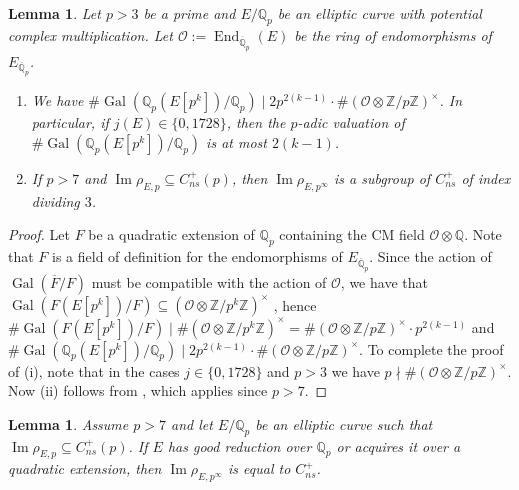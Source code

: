 \documentclass{amsart}
\newcommand{\op}[1]{\operatorname{#1}}
\newcommand{\Qp}{\mathbb{Q}_p}
\newcommand{\Qpbar}{\overline{\mathbb{Q}}_p}
\newtheorem{lemma}[theorem]{Lemma}
\theoremstyle{definition}
\newcommand{\Z}{\mathbb{Z}}
\newcommand{\Q}{\mathbb{Q}}
\numberwithin{theorem}{section}
\numberwithin{equation}{section}
\begin{document}
\begin{lemma}\label{lemma: description in potential CM case}
    Let $p>3$ be a prime and $E/\Q_p$ be an elliptic curve with potential complex multiplication. Let $\mathcal{O}:=\op{End}_{\Qpbar}(E)$ be the ring of endomorphisms of $E_{\overline{\Q}_p}$.
    \begin{enumerate}
        \item We have $\# \op{Gal}(\Q_p(E[p^k])/\Q_p) \mid 2p^{2(k-1)} \cdot \#(\mathcal{O} \otimes \Z/p\Z)^\times$. In particular, if $j(E) \in \{0, 1728\}$, then the $p$-adic valuation of $\# \op{Gal}(\Q_p(E[p^k])/\Q_p)$ is at most $2(k-1)$.
        \item If $p>7$ and
        $\operatorname{Im} \rho_{E, p} \subseteq C_{ns}^+(p)$, then $\operatorname{Im} \rho_{E, p^\infty}$ is a subgroup of $C_{ns}^+$ of index dividing $3$.
    \end{enumerate}
\end{lemma}

\begin{proof}
    Let $F$ be a quadratic extension of $\Qp$ containing the CM field $\mathcal{O} \otimes \Q$. Note that $F$ is a field of definition for the endomorphisms of $E_{\Qpbar}$. Since the action of $\op{Gal}(\overline{F}/F)$ must be compatible with the action of $\mathcal{O}$, we have that $\op{Gal}(F(E[p^k])/F) \subseteq (\mathcal{O} \otimes \mathbb{Z}/p^k\mathbb{Z})^{\times}$ \cite[p.~502, Corollary 2]{MR236190}, hence $\# \op{Gal}(F(E[p^k])/F) \mid \# (\mathcal{O} \otimes \mathbb{Z}/p^k\mathbb{Z})^{\times} = \# (\mathcal{O} \otimes \mathbb{Z}/p\mathbb{Z})^{\times} \cdot p^{2(k-1)}$ and $\# \op{Gal}(\Q_p(E[p^k])/\Q_p) \mid 2p^{2(k-1)} \cdot \#(\mathcal{O} \otimes \mathbb{Z}/p\mathbb{Z})^{\times}$. To complete the proof of (i), note that in the cases $j \in \{0, 1728\}$ and $p>3$ we have $p \nmid \#(\mathcal{O} \otimes \mathbb{Z}/p\mathbb{Z})^\times$. Now (ii) follows from , which applies since $p>7$.
\end{proof}

\begin{lemma}\label{lemma: p-adic image in the twisted crystalline case}
Assume $p>7$ and let $E/\mathbb{Q}_p$ be an elliptic curve such that $\operatorname{Im} \rho_{E,p} \subseteq C_{ns}^+(p)$. If $E$ has good reduction over $\Q_p$ or acquires it over a quadratic extension, then $\operatorname{Im} \rho_{E,p^\infty}$ is equal to $C_{ns}^+$.
\end{lemma}
\end{document}
